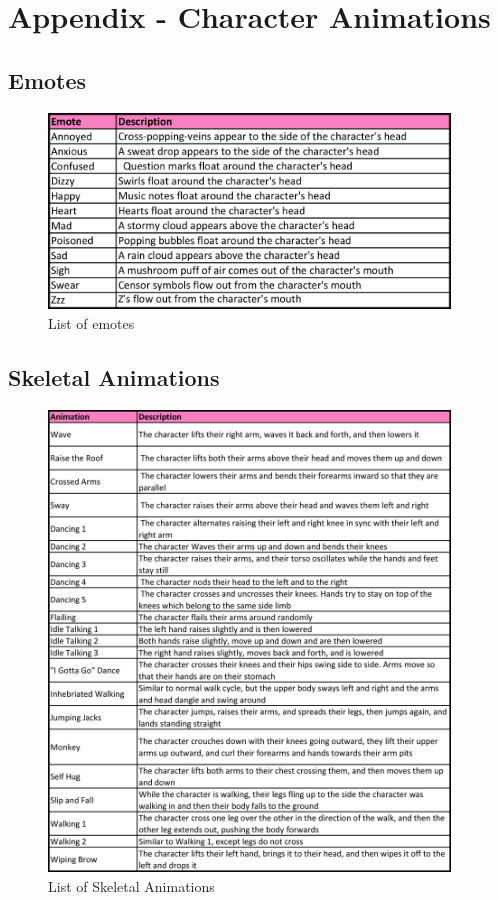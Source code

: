\appendix
\chapter{Appendix - Character Animations}
\section{Emotes}

\begin{figure}[H]
\centering
  \caption{List of emotes}
  \label{fig:emotes_list}
  \includegraphics[width=0.95\textwidth, height=0.7\paperheight, keepaspectratio=true]{images/table_emotes}
\end{figure}

\clearpage
\section{Skeletal Animations}

\begin{figure}[H]
\centering
  \caption{List of Skeletal Animations}
  \label{fig:animations_list}
  \includegraphics[width=0.95\textwidth, height=0.7\paperheight, keepaspectratio=true]{images/table_animations}
\end{figure}

